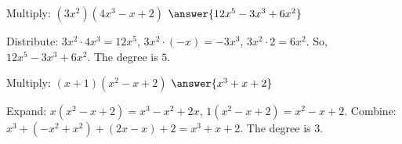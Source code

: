 \documentclass{ximera}
\begin{document}
\begin{problem}
Multiply: $(3x^2)(4x^3 - x + 2)$ $\answer{12x^5 - 3x^3 + 6x^2}$
\begin{feedback}
Distribute: $3x^2 \cdot 4x^3 = 12x^5$, $3x^2 \cdot (-x) = -3x^3$, $3x^2 \cdot 2 = 6x^2$. So, $12x^5 - 3x^3 + 6x^2$. The degree is $5$.
\end{feedback}
\end{problem}

\begin{problem}
Multiply: $(x + 1)(x^2 - x + 2)$ $\answer{ x^3 + x + 2}$
\begin{feedback}
Expand: $x(x^2 - x + 2) = x^3 - x^2 + 2x$, $1(x^2 - x + 2) = x^2 - x + 2$. Combine: $x^3 + ( - x^2 + x^2 ) + (2x - x) + 2 = x^3 + x + 2$. The degree is $3$.
\end{feedback}
\end{problem}

\end{document}
